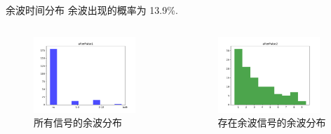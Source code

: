 \documentclass[10pt]{beamer}
\begin{document}
\begin{frame}[label={sec:orgcc25359}]{余波时间分布}
余波出现的概率为 13.9\%.

\begin{columns}
\begin{column}{0.5\columnwidth}
\begin{figure}[htbp]
\centering
\includegraphics[width=0.9\textwidth]{../../img/afterPulse01.pdf}
\caption{所有信号的余波分布}
\end{figure}
\end{column}

\begin{column}{0.5\columnwidth}
\begin{figure}[htbp]
\centering
\includegraphics[width=0.9\textwidth]{../../img/afterPulse02.pdf}
\caption{存在余波信号的余波分布}
\end{figure}
\end{column}
\end{columns}
\end{frame}
\end{document}
